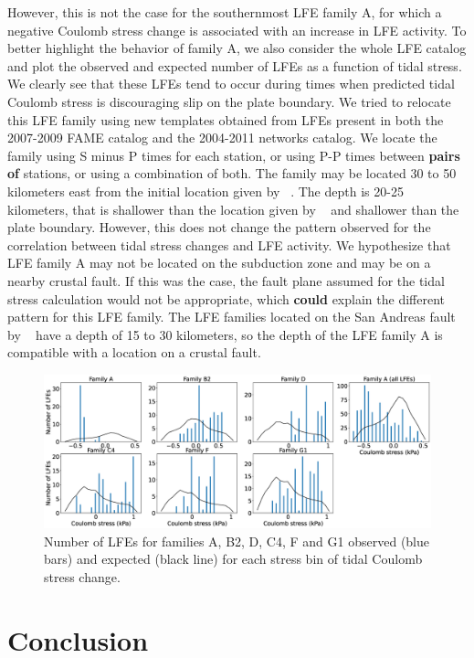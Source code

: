 \documentclass[draft]{agujournal2019}
\begin{document}
However, this is not the case for the southernmost LFE family A, for which a negative Coulomb stress change is associated with an increase in LFE activity. To better highlight the behavior of family A, we also consider the whole LFE catalog and plot the observed and expected number of LFEs as a function of tidal stress. We clearly see that these LFEs tend to occur during times when predicted tidal Coulomb stress is discouraging slip on the plate boundary. We tried to relocate this LFE family using new templates obtained from LFEs present in both the 2007-2009 FAME catalog and the 2004-2011 networks catalog. We locate the family using S minus P times for each station, or using P-P times between \textbf{pairs of} stations, or using a combination of both. The family may be located 30 to 50 kilometers east from the initial location given by ~. The depth is 20-25 kilometers, that is shallower than the location given by ~ and shallower than the plate boundary. However, this does not change the pattern observed for the correlation between tidal stress changes and LFE activity. We hypothesize that LFE family A may not be located on the subduction zone and may be on a nearby crustal fault. If this was the case, the fault plane assumed for the tidal stress calculation would not be appropriate, which \textbf{could} explain the different pattern for this LFE family. The LFE families located on the San Andreas fault by ~ have a depth of 15 to 30 kilometers, so the depth of the LFE family A is compatible with a location on a crustal fault.

\begin{figure}
\noindent\includegraphics[width=\textwidth, trim={0cm 0cm 0cm 0cm},clip]{figures/coulomb.eps}
\caption{Number of LFEs for families A, B2, D, C4, F and G1 observed (blue bars) and expected (black line) for each stress bin of tidal Coulomb stress change.}
\label{pngfiguresample}
\end{figure}

\section{Conclusion}
\end{document}
